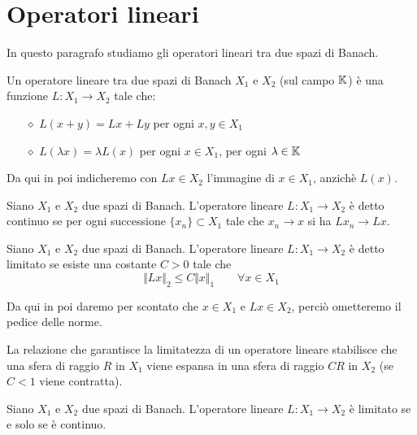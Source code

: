 \section{Operatori lineari}

In questo paragrafo studiamo gli operatori lineari tra due spazi di Banach.

\begin{defn}
Un operatore lineare tra due spazi di Banach $X_1$ e $X_2$ (sul campo $\mathbb{K}$) è una funzione $L:X_1\to X_2$ tale che:
\begin{enumerate}
    \item [$\diamond$] $L(x+y)=Lx+Ly$ per ogni $x,y\in X_1$
    \item [$\diamond$] $L(\lambda x)=\lambda L(x)$ per ogni $x\in X_1$, per ogni $\lambda\in\mathbb{K}$
\end{enumerate}
\end{defn}

Da qui in poi indicheremo con $Lx\in X_2$ l'immagine di $x\in X_1$, anzichè $L(x)$. 

\begin{defn}
Siano $X_1$ e $X_2$ due spazi di Banach. L'operatore lineare $L:X_1\to X_2$ è detto continuo se per ogni successione $\{x_n \}\subset X_1$ tale che $x_n\to x$ si ha $Lx_n\to Lx$.
\end{defn}

\begin{defn}
Siano $X_1$ e $X_2$ due spazi di Banach. L'operatore lineare $L:X_1\to X_2$ è detto limitato se esiste una costante $C>0$ tale che
\begin{equation*}
\Vert Lx\Vert_2\leq C\Vert x \Vert_1 \qquad \forall x \in X_1
\end{equation*}
\end{defn}

Da qui in poi daremo per scontato che $x\in X_1$ e $Lx\in X_2$, perciò ometteremo il pedice delle norme.

\begin{rem}
La relazione che garantisce la limitatezza di un operatore lineare stabilisce che una sfera di raggio $R$ in $X_1$ viene espansa in una sfera di raggio $CR$ in $X_2$ (se $C<1$ viene contratta).
\end{rem}

\begin{thm}
Siano $X_1$ e $X_2$ due spazi di Banach. L'operatore lineare $L:X_1\to X_2$ è limitato se e solo se è continuo.
\end{thm}

